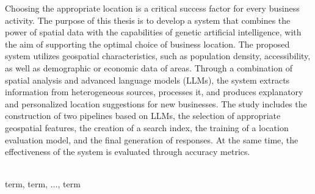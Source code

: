 
\begin{abstracteng}

Choosing the appropriate location is a critical success factor for every business activity. The purpose of this thesis is to develop a system that combines the power of spatial data with the capabilities of genetic artificial intelligence, with the aim of supporting the optimal choice of business location. The proposed system utilizes geospatial characteristics, such as population density, accessibility, as well as demographic or economic data of areas. Through a combination of spatial analysis and advanced language models (LLMs), the system extracts information from heterogeneous sources, processes it, and produces explanatory and personalized location suggestions for new businesses. The study includes the construction of two pipelines based on LLMs, the selection of appropriate geospatial features, the creation of a search index, the training of a location evaluation model, and the final generation of responses. At the same time, the effectiveness of the system is evaluated through accuracy metrics.

\vspace*{\fill}
\\ 
term, term, $\dots$, term
\end{abstracteng}